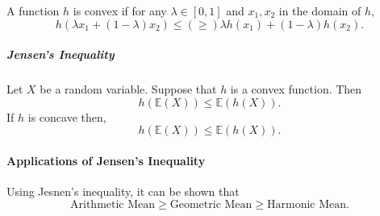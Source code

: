 A function \(h\) is convex if for any \(\lambda\in[0, 1]\)
and \(x_1, x_2\) in the domain of \(h\),
\[
    h(\lambda x_1 + (1-\lambda)x_2)
    \leq (\geq)
    \lambda h(x_1) + (1 -\lambda) h(x_2).
\]

\subparagraph{Jensen's Inequality}
Let \(X\) be a random variable.
Suppose that \(h\) is a convex function. Then \[
    h(\mathbb{E}(X)) \leq \mathbb{E}(h(X)).
\]
If \(h\) is concave then, \[
    h(\mathbb{E}(X)) \leq \mathbb{E}(h(X)).
\]

\paragraph{Applications of Jensen's Inequality}
Using Jesnen's inequality, it can be shown that
\[
    \text{Arithmetic Mean} \geq \text{Geometric Mean} \geq \text{Harmonic Mean}.
\]
